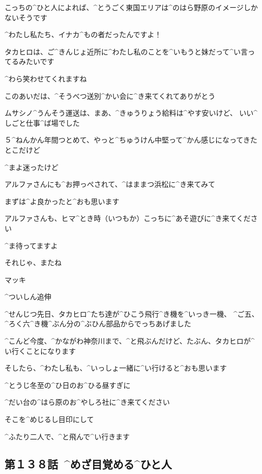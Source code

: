 \M こっちの^{ひと}{人}によれば、^{とうごく}{東国}エリアは^{のはら}{野原}のイメージしかないそうです

\M ^{わたし}{私}たち、イナカ^{もの}{者}だったんですよ！

\page
\M タカヒロは、ご^{きんじょ}{近所}に^{わたし}{私}のことを^{いもうと}{妹}だって^{い}{言}ってるみたいです

\M ^{わら}{笑}わせてくれますね

\page
\M このあいだは、^{そうべつ}{送別}^{かい}{会}に^{き}{来}てくれてありがとう

\M ムサシノ^{うんそう}{運送}は、まあ、^{きゅうりょう}{給料}は^{やす}{安}いけど、
いい^{しごと}{仕事}^{ば}{場}でした

\M ５^{ねんかん}{年間}つとめて、やっと^{ちゅうけん}{中堅}って^{かん}{感}じになってきたとこだけど

\M ^{まよ}{迷}ったけど

\page
\M アルファさんにも^{お}{押}っぺされて、^{はままつ}{浜松}に^{き}{来}てみて

\M まずは^{よ}{良}かったと^{おも}{思}います

\M アルファさんも、ヒマ^{とき}{時}（いつもか）こっちに^{あそ}{遊}びに^{き}{来}てください

\M ^{ま}{待}ってますよ

\page
\M それじゃ、またね

\M マッキ

\page
\M ^{ついしん}{追伸}

\M ^{せんじつ}{先日}、タカヒロ^{たち}{達}が^{ひこう}{飛行}^{き}{機}を^{いっき}{一機}、
^{ご}{五}、^{ろく}{六}^{き}{機}^{ぶん}{分}の^{ぶひん}{部品}からでっちあげました

\M ^{こんど}{今度}、^{かながわ}{神奈川}まで、^{と}{飛}ぶんだけど、たぶん、タカヒロが^{い}{行}くことになります

\page
\M そしたら、^{わたし}{私}も、^{いっしょ}{一緒}に^{い}{行}けると^{おも}{思}います

\M ^{とうじ}{冬至}の^{ひ}{日}のお^{ひる}{昼}すぎに

\M ^{だい}{台}の^{はら}{原}のお^{やしろ}{社}に^{き}{来}てください

\M そこを^{めじるし}{目印}にして

\page
\M ^{ふたり}{二人}で、^{と}{飛}んで^{い}{行}きます


\subsection{第１３８話\ ^{めざ}{目覚}める^{ひと}{人}}

